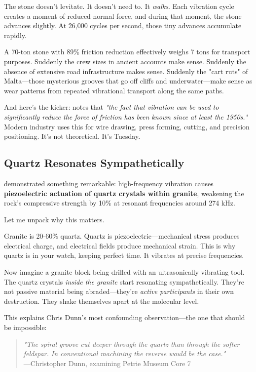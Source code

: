 \documentclass[11pt]{article}
\begin{document}
The stone doesn't levitate. It doesn't need to. It \textit{walks}. Each vibration cycle creates a moment of reduced normal force, and during that moment, the stone advances slightly. At 26,000 cycles per second, those tiny advances accumulate rapidly.

A 70-ton stone with 89\% friction reduction effectively weighs 7 tons for transport purposes. Suddenly the crew sizes in ancient accounts make sense. Suddenly the absence of extensive road infrastructure makes sense. Suddenly the "cart ruts" of Malta—those mysterious grooves that go off cliffs and underwater—make sense as wear patterns from repeated vibrational transport along the same paths.

And here's the kicker: \citeauthor{Popov2020} notes that \textit{"the fact that vibration can be used to significantly reduce the force of friction has been known since at least the 1950s."} Modern industry uses this for wire drawing, press forming, cutting, and precision positioning. It's not theoretical. It's Tuesday.

\subsection*{Quartz Resonates Sympathetically}

\citet{Saksala2023} demonstrated something remarkable: high-frequency vibration causes \textbf{piezoelectric actuation of quartz crystals within granite}, weakening the rock's compressive strength by 10\% at resonant frequencies around 274 kHz.

Let me unpack why this matters.

Granite is 20-60\% quartz. Quartz is piezoelectric—mechanical stress produces electrical charge, and electrical fields produce mechanical strain. This is why quartz is in your watch, keeping perfect time. It vibrates at precise frequencies.

Now imagine a granite block being drilled with an ultrasonically vibrating tool. The quartz crystals \textit{inside the granite} start resonating sympathetically. They're not passive material being abraded—they're \textit{active participants} in their own destruction. They shake themselves apart at the molecular level.

This explains Chris Dunn's most confounding observation—the one that should be impossible:

\begin{quote}
\textit{"The spiral groove cut deeper through the quartz than through the softer feldspar. In conventional machining the reverse would be the case."}\\
—Christopher Dunn, examining Petrie Museum Core 7
\end{quote}
\end{document}
